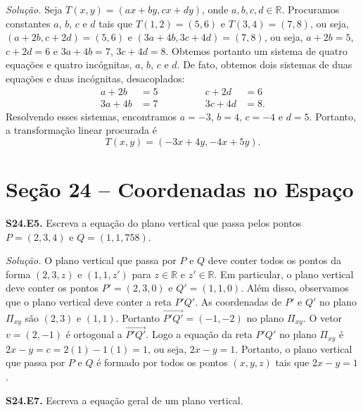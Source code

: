 \documentclass[a4paper,11pt]{article}
\newcommand{\R}{\mathbb{R}}
\begin{document}
\emph{Solução.}
Seja $T(x,y) = (ax + by, cx + dy)$, onde $a, b, c, d \in \R$.
Procuramos constantes $a$, $b$, $c$ e $d$ tais que $T(1,2) = (5,6)$ e $T(3,4) = (7,8)$, ou seja, $(a + 2b, c + 2d) = (5,6)$ e $(3a + 4b, 3c + 4d) = (7,8)$, ou seja, $a + 2b = 5$, $c + 2d = 6$ e $3a + 4b = 7$, $3c + 4d = 8$.
Obtemos portanto um sistema de quatro equações e quatro incógnitas, $a$, $b$, $c$ e $d$.
De fato, obtemos dois sistemas de duas equações e duas incógnitas, desacoplados:
\[
  \begin{aligned}
    a + 2b & = 5 \\
    3a + 4b & = 7
  \end{aligned}
  \qquad \qquad
  \begin{aligned}
    c + 2d & = 6 \\
    3c + 4d & = 8.
  \end{aligned}
\]
Resolvendo esses sistemas, encontramos $a = -3$, $b = 4$, $c = -4$ e $d = 5$.
Portanto, a transformação linear procurada é
\[
  T(x,y) = (-3x + 4y, -4x + 5y).
\]

\section*{Seção 24 -- Coordenadas no Espaço}

\textbf{S24.E5.}
Escreva a equação do plano vertical que passa pelos pontos $P\!=\!(2,3,4)$ e $Q = (1,1,758)$.

\vspace{\baselineskip}

\emph{Solução.}
O plano vertical que passa por $P$ e $Q$ deve conter todos os pontos da forma $(2,3,z)$ e $(1,1,z')$ para $z \in \R$ e $z' \in \R$.
Em particular, o plano vertical deve conter os pontos $P' = (2,3,0)$ e $Q' = (1,1,0)$.
Além disso, observamos que o plano vertical deve conter a reta $P'Q'$.
As coordenadas de $P'$ e $Q'$ no plano $\Pi_{xy}$ são $(2,3)$ e $(1,1)$.
Portanto $\overrightarrow{P'Q'} = (-1,-2)$ no plano $\Pi_{xy}$.
O vetor $v = (2,-1)$ é ortogonal a $\overrightarrow{P'Q'}$.
Logo a equação da reta $P'Q'$ no plano $\Pi_{xy}$ é $2x - y = c = 2(1) - 1(1) = 1$, ou seja, $2x - y = 1$.
Portanto, o plano vertical que passa por $P$ e $Q$ é formado por todos os pontos $(x,y,z)$ tais que $2x - y = 1$.

\vspace{\baselineskip}

\textbf{S24.E7.}
Escreva a equação geral de um plano vertical.

\vspace{\baselineskip}
\end{document}
